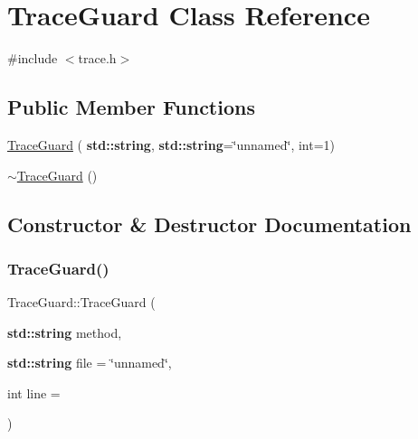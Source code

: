 \hypertarget{class_trace_guard}{}\section{Trace\+Guard Class Reference}
\label{class_trace_guard}


{\ttfamily \#include $<$trace.\+h$>$}

\subsection*{Public Member Functions}
\begin{DoxyCompactItemize}
\item 
\hyperlink{class_trace_guard_a25457fa2136d34439f3572d8e497f7a3}{Trace\+Guard} (\textbf{ std\+::string}, \textbf{ std\+::string}=\char`\"{}unnamed\char`\"{}, int=1)
\item 
\hyperlink{class_trace_guard_ade02f16dafa92b8835808f1403c730ca}{$\sim$\+Trace\+Guard} ()
\end{DoxyCompactItemize}


\subsection{Constructor \& Destructor Documentation}
\mbox{\label{class_trace_guard_a25457fa2136d34439f3572d8e497f7a3}} 
\subsubsection{\texorpdfstring{Trace\+Guard()}{TraceGuard()}}
{\footnotesize\ttfamily Trace\+Guard\+::\+Trace\+Guard (\begin{DoxyParamCaption}\item[{\textbf{ std\+::string}}]{method,  }\item[{\textbf{ std\+::string}}]{file = {\ttfamily \char`\"{}unnamed\char`\"{}},  }\item[{int}]{line = {} }\end{DoxyParamCaption})}

\mbox{\label{class_trace_guard_ade02f16dafa92b8835808f1403c730ca}} 
